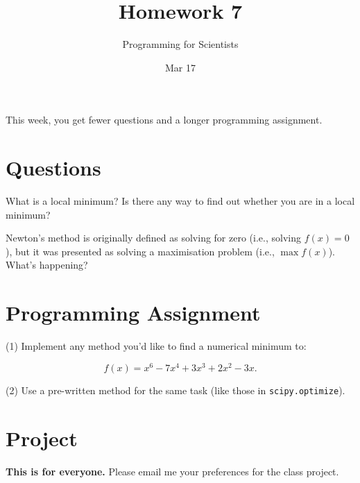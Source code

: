 
\author{Programming for Scientists}
\title{Homework 7}
\date{Mar 17}

\maketitle

This week, you get fewer questions and a longer programming assignment.

\chapter{Questions}

\question %
What is a local minimum? Is there any way to find out whether you are in a local minimum?

\question %
Newton's method is originally defined as solving for zero (i.e., solving $f(x) = 0$), but it was presented as solving a maximisation problem (i.e., $\max f(x)$). What's happening?

\chapter{Programming Assignment}

(1) Implement any method you'd like to find a numerical minimum to:

\begin{equation}
f(x) = x^6-7x^4+3x^3+2x^2-3x.
\end{equation}

(2) Use a pre-written method for the same task (like those in \lstinline{scipy.optimize}).

\chapter{Project}

\textbf{This is for everyone.} Please email me your preferences for the class project.


